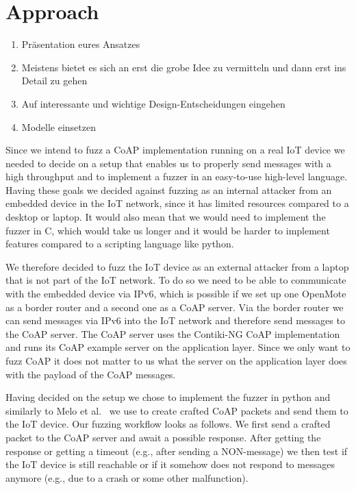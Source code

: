 \section{Approach}
\label{section:approach}

\begin{enumerate}
	\item Präsentation eures Ansatzes
	\item Meistens bietet es sich an erst die grobe Idee zu vermitteln und dann erst ins Detail zu gehen
	\item Auf interessante und wichtige Design-Entscheidungen eingehen
	\item Modelle einsetzen
\end{enumerate}

Since we intend to fuzz a CoAP implementation running on a real IoT device we needed to decide on a setup that enables us to properly send messages with a high throughput and to implement a fuzzer in an easy-to-use high-level language. Having these goals we decided against fuzzing as an internal attacker from an embedded device in the IoT network, since it has limited resources compared to a desktop or laptop. It would also mean that we would need to implement the fuzzer in C, which would take us longer and it would be harder to implement features compared to a scripting language like python.

We therefore decided to fuzz the IoT device as an external attacker from a laptop that is not part of the IoT network. To do so we need to be able to communicate with the embedded device via IPv6, which is possible if we set up one OpenMote as a border router and a second one as a CoAP server. Via the border router we can send messages via IPv6 into the IoT network and therefore send messages to the CoAP server. The CoAP server uses the Contiki-NG CoAP implementation and runs its CoAP example server on the application layer. Since we only want to fuzz CoAP it does not matter to us what the server on the application layer does with the payload of the CoAP messages.

Having decided on the setup we chose to implement the fuzzer in python and similarly to Melo et al.~\cite{Melo2017RobustnessTO} we use \scapy to create crafted CoAP packets and send them to the IoT device. Our fuzzing workflow looks as follows. We first send a crafted packet to the CoAP server and await a possible response. After getting the response or getting a timeout (e.g., after sending a NON-message) we then test if the IoT device is still reachable or if it somehow does not respond to messages anymore (e.g., due to a crash or some other malfunction). 

